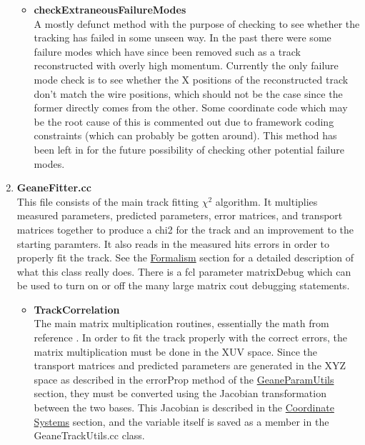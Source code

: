 \begin{enumerate}
\begin{itemize}
          \item{\bf{checkExtraneousFailureModes}} \\
          A mostly defunct method with the purpose of checking to see whether the tracking has failed in some unseen way. In the past there were some failure modes which have since been removed such as a track reconstructed with overly high momentum. Currently the only failure mode check is to see whether the X positions of the reconstructed track don't match the wire positions, which should not be the case since the former directly comes from the other. Some coordinate code which may be the root cause of this is commented out due to framework coding constraints (which can probably be gotten around). This method has been left in for the future possibility of checking other potential failure modes.

        \end{itemize}

      \item{\bf{GeaneFitter.cc}} \\
      This file consists of the main track fitting $\chi^{2}$ algorithm. It multiplies measured parameters, predicted parameters, error matrices, and transport matrices together to produce a chi2 for the track and an improvement to the starting paramters. It also reads in the measured hits errors in order to properly fit the track. See the \hyperref[sec:Formalism]{Formalism} section for a detailed description of what this class really does. There is a fcl parameter matrixDebug which can be used to turn on or off the many large matrix cout debugging statements.

        \begin{itemize}

          \item{\bf{TrackCorrelation}} \\
          The main matrix multiplication routines, essentially the math from reference \cite{geanemanual}. In order to fit the track properly with the correct errors, the matrix multiplication must be done in the XUV space. Since the transport matrices and predicted parameters are generated in the XYZ space as described in the errorProp method of the \hyperref[sec:GeaneParamUtils]{GeaneParamUtils} section, they must be converted using the Jacobian transformation between the two bases. This Jacobian is described in the \hyperref[sec:Coord]{Coordinate Systems} section, and the variable itself is saved as a member in the GeaneTrackUtils.cc class. 


\end{itemize}
\end{enumerate}
